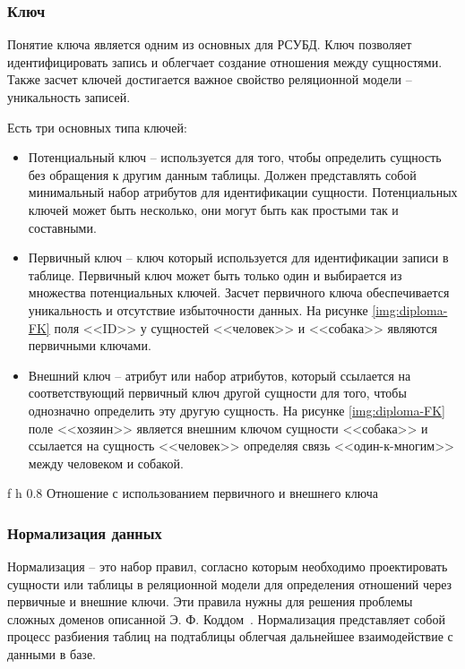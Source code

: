\subsubsection{Ключ}
Понятие ключа является одним из основных для РСУБД.
Ключ позволяет идентифицировать запись и облегчает создание отношения между сущностями.
Также засчет ключей достигается важное свойство реляционной модели -- уникальность записей.

Есть три основных типа ключей:
\begin{itemize}[label=---]
    \item Потенциальный ключ -- используется для того,
    чтобы определить сущность без обращения к другим данным таблицы.
    Должен представлять собой минимальный набор атрибутов для идентификации сущности.
    Потенциальных ключей может быть несколько, они могут быть как простыми так и составными.

    \item Первичный ключ -- ключ который используется для идентификации записи в таблице.
    Первичный ключ может быть только один и выбирается из множества потенциальных ключей.
    Засчет первичного ключа обеспечивается уникальность и отсутствие избыточности данных.
    На рисунке \ref{img:diploma-FK} поля <<ID>> у сущностей <<человек>> и <<собака>> являются первичными ключами.

    \item Внешний ключ -- атрибут или набор атрибутов, который ссылается на соответствующий
    первичный ключ другой сущности для того, чтобы однозначно определить эту другую сущность.
    На рисунке \ref{img:diploma-FK} поле <<хозяин>> является внешним ключом сущности <<собака>> и ссылается на сущность <<человек>>
    определяя связь <<один-к-многим>> между человеком и собакой.

\end{itemize}

\clearpage

    {f} %
    {h} %
    {0.8\textwidth} %
{Отношение с использованием первичного и внешнего ключа} %

\subsubsection{Нормализация данных}
Нормализация -- это набор правил, согласно которым необходимо 
проектировать сущности или таблицы в реляционной модели для определения отношений через
первичные и внешние ключи. Эти правила нужны для решения проблемы сложных доменов
описанной Э. Ф. Коддом~\cite{Codd_Relational}.
Нормализация представляет собой процесс разбиения таблиц на подтаблицы облегчая дальнейшее взаимодействие с данными в базе.

